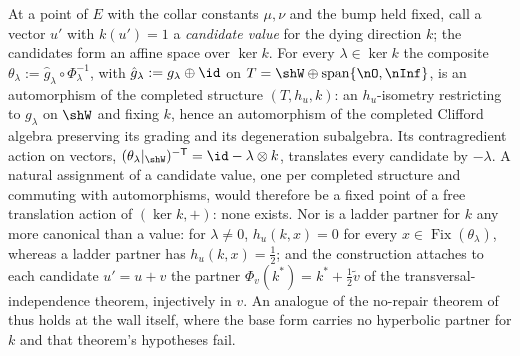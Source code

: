 At a point of $E$ with the collar constants $\mu, \nu$ and the bump held fixed, call a vector $u'$ with $k(u') = 1$ a \emph{candidate value} for the dying direction $k$; the candidates form an affine space over $\ker k$. For every $\lambda \in \ker k$ the composite $\theta_\lambda := \hat g_\lambda \circ \Phi_\lambda^{-1}$, with $\hat g_\lambda := g_\lambda \oplus \id$ on $T = \shW \oplus \operatorname{span}\{\nO, \nInf\}$, is an automorphism of the completed structure $(T, h_u, k)$: an $h_u$-isometry restricting to $g_\lambda$ on $\shW$ and fixing $k$, hence an automorphism of the completed Clifford algebra preserving its grading and its degeneration subalgebra. Its contragredient action on vectors, $(\theta_\lambda|_{\shW})^{-\mathsf{T}} = \id - \lambda \otimes k$, translates every candidate by $-\lambda$. A natural assignment of a candidate value, one per completed structure and commuting with automorphisms, would therefore be a fixed point of a free translation action of $(\ker k, +)$: none exists. Nor is a ladder partner for $k$ any more canonical than a value: for $\lambda \neq 0$, $h_u(k, x) = 0$ for every $x \in \operatorname{Fix}(\theta_\lambda)$, whereas a ladder partner has $h_u(k, x) = \tfrac12$; and the construction attaches to each candidate $u' = u + v$ the partner $\Phi_v(k^*) = k^* + \tfrac12\tilde v$ of the transversal-independence theorem, injectively in $v$. An analogue of the no-repair theorem of \cite[Thm.~4.2]{ButlerT1} thus holds at the wall itself, where the base form carries no hyperbolic partner for $k$ and that theorem's hypotheses fail.
